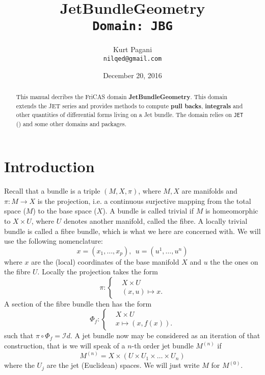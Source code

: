 \documentclass[12pt,a4paper]{article}
\author{Kurt Pagani \\ {\tt nilqed@gmail.com}}
\date{December 20, 2016}
\title{JetBundleGeometry \\ {\small\tt Domain: JBG}}
\begin{document}
\maketitle
%
\begin{abstract}
This manual decribes the FriCAS domain {\bf JetBundleGeometry}.
This domain extends the JET series and provides methods to compute
{\bf pull backs}, {\bf integrals} and other quantities of 
differential forms living on a Jet bundle. The domain relies on
{\tt JET} (\cite{wms:jet}) and some other domains and packages. 
\end{abstract}
%
\tableofcontents
\section{Introduction}
Recall that a bundle is a triple $(M,X,\pi)$, where $M,X$ are manifolds
and $\pi:M\rightarrow X$ is the projection, i.e. a continuous surjective
mapping from the total space ($M$) to the base space ($X$). A bundle is 
called trivial if $M$ is homeomorphic to $X\times U$, where
$U$ denotes another manifold, called the fibre. A locally trivial bundle
is called a fibre bundle, which is what we here are concerned with.
We will use the following nomenclature: 
\begin{displaymath}
   x=(x_1,\ldots,x_p), \ \ u=(u^1,\ldots,u^n)
\end{displaymath}
where $x$ are the (local) coordinates of the base manifold $X$ and $u$
the the ones on the fibre $U$. Locally the projection takes the form
\begin{displaymath}
 \pi:\begin{cases} 
      & X\times U \\
      & (x,u) \mapsto x.
   \end{cases}
\end{displaymath}
A section of the fibre bundle then has the form
\begin{displaymath}
 \Phi_f:\begin{cases} 
      & X\times U \\
      & x \mapsto (x,f(x)).
\end{cases}
\end{displaymath}
such that $\pi\circ \Phi_f = \mathcal{I}d$.
A jet bundle now may be considered as an iteration of that construction,
that is we will speak of a $n$-th order jet bundle $M^{(n)}$ if
\begin{displaymath}
 M^{(n)} = X \times \left( U\times U_1\times\ldots\times U_n  \right)
\end{displaymath}  
where the $U_j$ are the jet (Euclidean) spaces. We will just write $M$
for $M^{(0)}$. 
\end{document}

